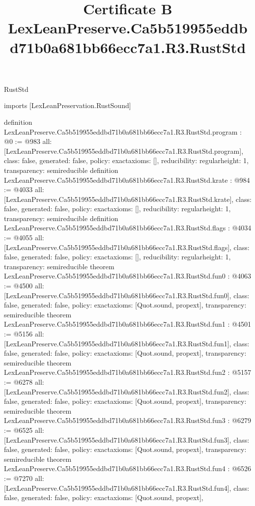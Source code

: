 \begin{lexlean}{RustStd}
\title{Certificate B LexLeanPreserve.Ca5b519955eddbd71b0a681bb66ecc7a1.R3.RustStd}
\begin{coremodule}
imports [LexLeanPreservation.RustSound]

definition LexLeanPreserve.Ca5b519955eddbd71b0a681bb66ecc7a1.R3.RustStd.program : @0 := @983 {
  all: [LexLeanPreserve.Ca5b519955eddbd71b0a681bb66ecc7a1.R3.RustStd.program],
  class: false,
  generated: false,
  policy: exact{axioms: []},
  reducibility: regular{height: 1},
  transparency: semireducible
}
definition LexLeanPreserve.Ca5b519955eddbd71b0a681bb66ecc7a1.R3.RustStd.krate : @984 := @4033 {
  all: [LexLeanPreserve.Ca5b519955eddbd71b0a681bb66ecc7a1.R3.RustStd.krate],
  class: false,
  generated: false,
  policy: exact{axioms: []},
  reducibility: regular{height: 1},
  transparency: semireducible
}
definition LexLeanPreserve.Ca5b519955eddbd71b0a681bb66ecc7a1.R3.RustStd.flags : @4034 := @4055 {
  all: [LexLeanPreserve.Ca5b519955eddbd71b0a681bb66ecc7a1.R3.RustStd.flags],
  class: false,
  generated: false,
  policy: exact{axioms: []},
  reducibility: regular{height: 1},
  transparency: semireducible
}
theorem LexLeanPreserve.Ca5b519955eddbd71b0a681bb66ecc7a1.R3.RustStd.fun0 : @4063 := @4500 {
  all: [LexLeanPreserve.Ca5b519955eddbd71b0a681bb66ecc7a1.R3.RustStd.fun0],
  class: false,
  generated: false,
  policy: exact{axioms: [Quot.sound, propext]},
  transparency: semireducible
}
theorem LexLeanPreserve.Ca5b519955eddbd71b0a681bb66ecc7a1.R3.RustStd.fun1 : @4501 := @5156 {
  all: [LexLeanPreserve.Ca5b519955eddbd71b0a681bb66ecc7a1.R3.RustStd.fun1],
  class: false,
  generated: false,
  policy: exact{axioms: [Quot.sound, propext]},
  transparency: semireducible
}
theorem LexLeanPreserve.Ca5b519955eddbd71b0a681bb66ecc7a1.R3.RustStd.fun2 : @5157 := @6278 {
  all: [LexLeanPreserve.Ca5b519955eddbd71b0a681bb66ecc7a1.R3.RustStd.fun2],
  class: false,
  generated: false,
  policy: exact{axioms: [Quot.sound, propext]},
  transparency: semireducible
}
theorem LexLeanPreserve.Ca5b519955eddbd71b0a681bb66ecc7a1.R3.RustStd.fun3 : @6279 := @6525 {
  all: [LexLeanPreserve.Ca5b519955eddbd71b0a681bb66ecc7a1.R3.RustStd.fun3],
  class: false,
  generated: false,
  policy: exact{axioms: [Quot.sound, propext]},
  transparency: semireducible
}
theorem LexLeanPreserve.Ca5b519955eddbd71b0a681bb66ecc7a1.R3.RustStd.fun4 : @6526 := @7270 {
  all: [LexLeanPreserve.Ca5b519955eddbd71b0a681bb66ecc7a1.R3.RustStd.fun4],
  class: false,
  generated: false,
  policy: exact{axioms: [Quot.sound, propext]},
}
\end{coremodule}
\end{lexlean}
